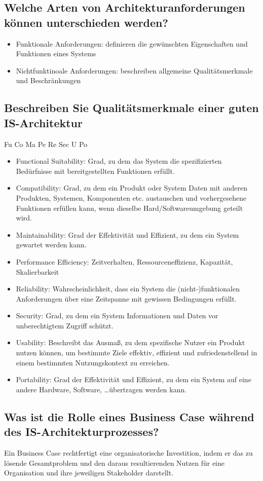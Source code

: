 \documentclass{article}
\begin{document}
\subsection{Welche Arten von Architekturanforderungen können unterschieden werden?}
\begin{itemize}
    \item Funktionale Anforderungen: definieren die gewünschten Eigenschaften und Funktionen eines Systems
    \item Nichtfunktinoale Anforderungen: beschreiben allgemeine Qualitätsmerkmale und Beschränkungen
\end{itemize}
\subsection{Beschreiben Sie Qualitätsmerkmale einer guten IS-Architektur}
\Large Fu Co Ma Pe Re Sec U Po
\begin{itemize}
    \item Functional Suitability: Grad, zu dem das System die spezifizierten Bedürfnisse mit bereitgestellten Funktionen erfüllt.
    \item Compatibility: Grad, zu dem ein Produkt oder System Daten mit anderen Produkten, Systemen, Komponenten etc. austauschen und vorhergesehene Funktionen erfüllen kann, wenn dieselbe Hard/Softwareumgebung geteilt wird.
    \item Maintainability: Grad der Effektivität und Effizient, zu dem ein System gewartet werden kann.
    \item Performance Efficiency: Zeitverhalten, Ressourceneffizienz, Kapazität, Skalierbarkeit
    \item Reliability: Wahrscheinlichkeit, dass ein System die (nicht-)funktionalen Anforderungen über eine Zeitspanne mit gewissen Bedingungen erfüllt.
    \item Security: Grad, zu dem ein System Informationen und Daten vor unberechtigtem Zugriff schützt.
    \item Usability: Beschreibt das Ausmaß, zu dem spezifische Nutzer ein Produkt nutzen können, um bestimmte Ziele effektiv, effizient und zufriedenstellend in einem bestimmten Nutzungskontext zu erreichen.
    \item Portability: Grad der Effektivität und Effizient, zu dem ein System auf eine andere Hardware, Software, \ldots übertragen werden kann.
\end{itemize}
\subsection{Was ist die Rolle eines Business Case während des IS-Architekturprozesses?}
Ein Business Case rechtfertigt eine organisatorische Investition, indem er das zu lösende Gesamtproblem und den daraus resultierenden Nutzen für eine Organisation und ihre jeweiligen Stakeholder darstellt.
\end{document}
